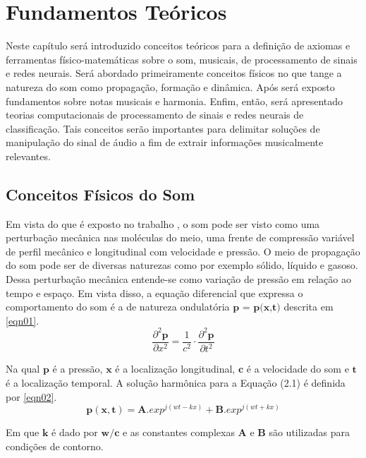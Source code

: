 \chapter{Fundamentos Teóricos}
\label{chap:fundamentosteoricos}

Neste capítulo será introduzido conceitos teóricos para a definição de axiomas e ferramentas físico-matemáticas sobre o som, musicais, de processamento de sinais e redes neurais. Será abordado primeiramente conceitos físicos no que tange a natureza do som como propagação, formação e dinâmica. Após será exposto fundamentos sobre notas musicais e harmonia. Enfim, então, será apresentado teorias computacionais de processamento de sinais e redes neurais de classificação. Tais conceitos serão importantes para delimitar soluções de manipulação do sinal de áudio a fim de extrair informações musicalmente relevantes.

\section{Conceitos Físicos do Som}
\label{sec:conceitosfiscossom}

Em vista do que é exposto no trabalho  \cite{portela2008caracterizaccao}, o som pode ser visto como uma perturbação mecânica nas moléculas do meio, uma frente de compressão variável  de perfil mecânico e longitudinal com velocidade e pressão. O meio de propagação do som pode ser de diversas naturezas como por exemplo sólido, líquido e gasoso. Dessa perturbação mecânica entende-se como variação de pressão em relação ao tempo e espaço. Em vista disso, a equação diferencial que expressa o comportamento do som é a de natureza ondulatória $\textbf{p = p(x,t)}$ descrita em \ref{eqn01}.
\begin{equation}
\label{eqn01}
	\frac{\partial^{2}\mathbf{p}}{\partial x^{2}} = \frac{1}{c^{2}}\cdot \frac{\partial^{2}\mathbf{p}}{\partial t^{2}}
\end{equation}

Na qual $\textbf{p}$ é a pressão, $\textbf{x}$ é a localização longitudinal, $\textbf{c}$ é a velocidade do som e $\textbf{t}$ é a localização temporal. A solução harmônica para a Equação (2.1) é definida por \ref{eqn02}.
\begin{equation}
\label{eqn02}
	\mathbf{p(x,t)} = \mathbf{A}.{exp}^{j(wt - kx)} + \mathbf{B}.{exp}^{j(wt + kx)}
\end{equation}

Em que $\textbf{k}$ é dado por $\textbf{w}/\textbf{c}$ e as constantes complexas $\textbf{A}$ e $\textbf{B}$ são utilizadas para condições de contorno.

